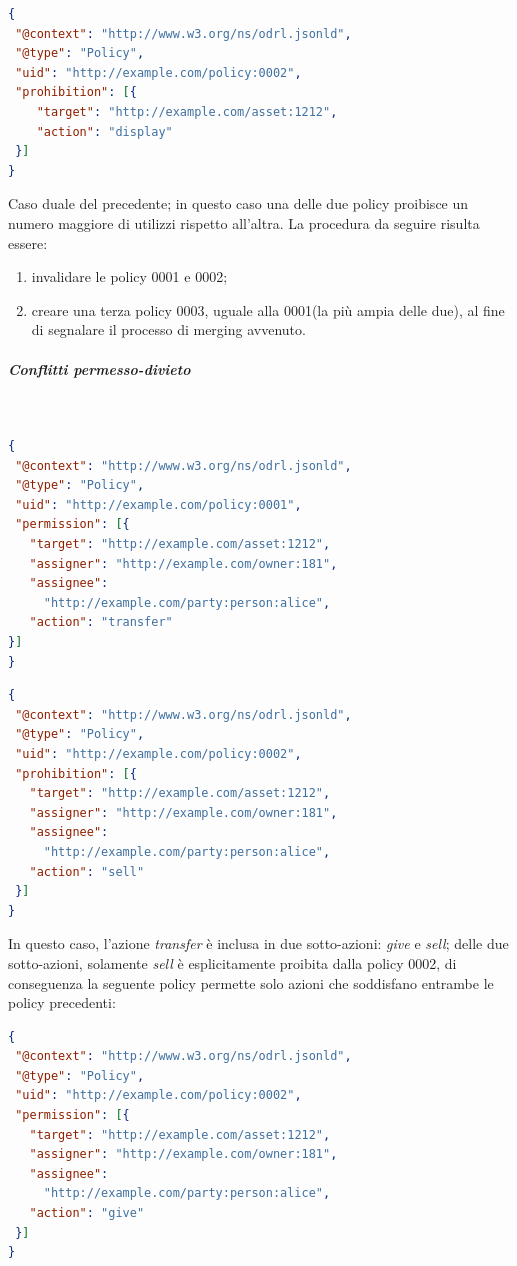 \documentclass[12pt,a4paper,twoside]{book}
\begin{document}
\begin{lstlisting}[language=json,firstnumber=1,caption={La policy 0002 proibisce la riproduzione dell'asset 1212 a chiunque},captionpos=b]
{
 "@context": "http://www.w3.org/ns/odrl.jsonld",
 "@type": "Policy",
 "uid": "http://example.com/policy:0002",
 "prohibition": [{
    "target": "http://example.com/asset:1212",
    "action": "display"
 }]
}
\end{lstlisting}
Caso duale del precedente; in questo caso una delle due policy proibisce un numero maggiore di utilizzi rispetto all'altra. La procedura da seguire risulta essere:
\begin{enumerate}
	\item invalidare le policy 0001 e 0002;
	\item creare una terza policy 0003, uguale alla 0001(la più ampia delle due), al fine di segnalare il processo di merging avvenuto.
\end{enumerate}
\subparagraph{Conflitti permesso-divieto}\label{permdiv}\mbox{}\\
\begin{lstlisting}[language=json,firstnumber=1,caption={La policy 0001 permette il trasferimento dell'asset 1212 al soggetto Alice},captionpos=b]
{
 "@context": "http://www.w3.org/ns/odrl.jsonld",
 "@type": "Policy",
 "uid": "http://example.com/policy:0001",
 "permission": [{
   "target": "http://example.com/asset:1212",
   "assigner": "http://example.com/owner:181",
   "assignee": 
     "http://example.com/party:person:alice",
   "action": "transfer"
}]
}
\end{lstlisting}
\begin{lstlisting}[language=json,firstnumber=1,caption={La policy 0002 proibisce la vendita dell'asset 1212 al soggetto Alice},captionpos=b]
{
 "@context": "http://www.w3.org/ns/odrl.jsonld",
 "@type": "Policy",
 "uid": "http://example.com/policy:0002",
 "prohibition": [{
   "target": "http://example.com/asset:1212",
   "assigner": "http://example.com/owner:181",
   "assignee": 
     "http://example.com/party:person:alice",
   "action": "sell"
 }]
}
\end{lstlisting}
In questo caso, l'azione \textit{transfer} è inclusa in due sotto-azioni: \textit{give} e \textit{sell}; delle due sotto-azioni, solamente \textit{sell} è esplicitamente proibita dalla policy 0002, di conseguenza la seguente policy permette solo azioni che soddisfano entrambe le policy precedenti:\newpage
\begin{lstlisting}[language=json,firstnumber=1,caption={La policy 0003 consente al soggetto Alice di cedere l'asset 1212 senza richiedere un compenso e cancellando l'asset dal proprio insieme di dati},captionpos=b]
{
 "@context": "http://www.w3.org/ns/odrl.jsonld",
 "@type": "Policy",
 "uid": "http://example.com/policy:0002",
 "permission": [{
   "target": "http://example.com/asset:1212",
   "assigner": "http://example.com/owner:181",
   "assignee": 
     "http://example.com/party:person:alice",
   "action": "give"
 }]
}
\end{lstlisting}
\end{document}
